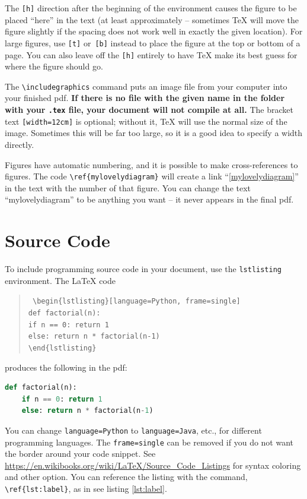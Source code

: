 \documentclass[11pt]{report}
\newcommand{\cmd}[1]{\texttt{\textbackslash{}#1}}
\begin{document}
The \texttt{[h]} direction after the beginning of the environment causes the figure to be placed ``here'' in the text (at least approximately -- sometimes \TeX{} will move the figure slightly if the spacing does not work well in exactly the given location). For large figures, use \texttt{[t]} or~\texttt{[b]} instead to place the figure at the top or bottom of a page. You can also leave off the \texttt{[h]} entirely to have \TeX{} make its best guess for where the figure should go.

The \cmd{includegraphics} command puts an image file from your computer into your finished pdf. \textbf{If there is no file with the given name in the folder with your \texttt{.tex} file, your document will not compile at all.} The bracket text \texttt{[width=12cm]} is optional; without it, \TeX{} will use the normal size of the image. Sometimes this will be far too large, so it is a good idea to specify a width directly.

Figures have automatic numbering, and it is possible to make cross-references to figures. The code \cmd{ref\{mylovelydiagram\}} will create a link ``\ref{mylovelydiagram}'' in the text with the number of that figure. You can change the text ``mylovelydiagram'' to be anything you want -- it never appears in the final pdf.

\section{Source Code}

To include programming source code in your document, use the \texttt{lstlisting} environment. The \LaTeX{} code
\begin{quote}\tt
	\textbackslash{}begin\{lstlisting\}[language=Python, frame=single] \\[-0.5em]
    \hspace*{2em}def factorial(n): \\[-0.5em]
    \hspace*{4em}if n == 0: return 1 \\[-0.5em]
    \hspace*{4em}else: return n * factorial(n-1) \\[-0.5em]
    \textbackslash{}end\{lstlisting\}
\end{quote}
produces the following in the pdf: \\
\begin{lstlisting}[language=Python, frame=single, label={lst:label}, caption={Some Python code}]
def factorial(n):
	if n == 0: return 1
	else: return n * factorial(n-1)
\end{lstlisting}
You can change \texttt{language=Python} to \texttt{language=Java}, etc., for different programming languages. The \texttt{frame=single} can be removed if you do not want the border around your code snippet. See \url{https://en.wikibooks.org/wiki/LaTeX/Source_Code_Listings} for syntax coloring and other option. You can reference the listing with the command, \texttt{\textbackslash{}ref\{lst:label\}}, as in see listing \ref{lst:label}.
\end{document}
